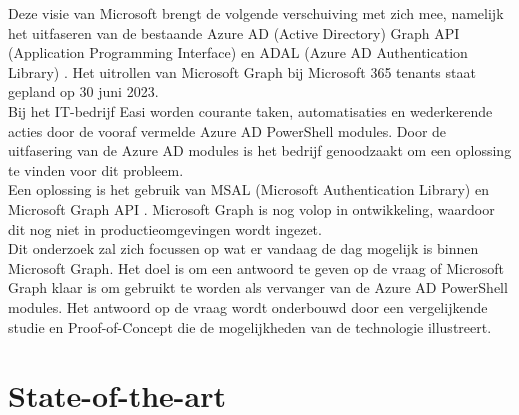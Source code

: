 Deze visie van Microsoft brengt de volgende verschuiving met zich mee, namelijk het uitfaseren van de bestaande Azure AD (Active Directory) Graph API (Application Programming Interface) en ADAL (Azure AD Authentication Library) \autocite{Sahay2022}. Het uitrollen van Microsoft Graph bij Microsoft 365 tenants staat gepland op 30 juni 2023. \\

Bij het IT-bedrijf Easi worden courante taken, automatisaties en wederkerende acties door de vooraf vermelde Azure AD PowerShell modules. Door de uitfasering van de Azure AD modules is het bedrijf genoodzaakt om een oplossing te vinden voor dit probleem. \\

Een oplossing is het gebruik van MSAL (Microsoft Authentication Library) en Microsoft Graph API \autocite{Microsoft2023Va}. Microsoft Graph is nog volop in ontwikkeling, waardoor dit nog niet in productieomgevingen wordt ingezet. \\

Dit onderzoek zal zich focussen op wat er vandaag de dag mogelijk is binnen Microsoft Graph. Het doel is om een antwoord te geven op de vraag of Microsoft Graph klaar is om gebruikt te worden als vervanger van de Azure AD PowerShell modules. Het antwoord op de vraag wordt onderbouwd door een vergelijkende studie en Proof-of-Concept die de mogelijkheden van de technologie illustreert.



\section{State-of-the-art}%
\label{sec:state-of-the-art}


